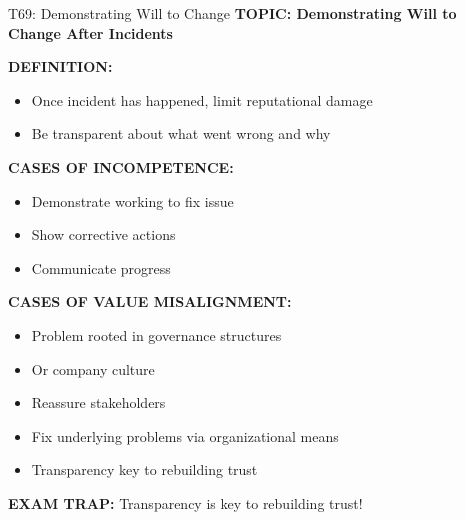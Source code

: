 \documentclass[8pt]{beamer}
\begin{document}
	\begin{frame}{T69: Demonstrating Will to Change}
		\fontsize{6.5}{7.5}\selectfont
		\textbf{TOPIC: Demonstrating Will to Change After Incidents}
		
		\vspace{0.1cm}
		\textbf{DEFINITION:}
		\begin{itemize}
			\item Once incident has happened, limit reputational damage
			\item Be transparent about what went wrong and why
		\end{itemize}
		
		\vspace{0.1cm}
		\textbf{CASES OF INCOMPETENCE:}
		\begin{itemize}
			\item Demonstrate working to fix issue
			\item Show corrective actions
			\item Communicate progress
		\end{itemize}
		
		\vspace{0.1cm}
		\textbf{CASES OF VALUE MISALIGNMENT:}
		\begin{itemize}
			\item Problem rooted in governance structures
			\item Or company culture
			\item Reassure stakeholders
			\item Fix underlying problems via organizational means
			\item Transparency key to rebuilding trust
		\end{itemize}
		
		\textcolor{myred}{\textbf{EXAM TRAP:}} Transparency is \textcolor{myblue}{key to rebuilding trust}!
	\end{frame}
	
\end{document}
